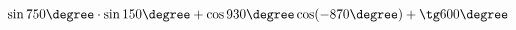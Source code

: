 \begin{ex}[type=calculate]
	\begin{condition}
		\( \sin750\degree\cdot\sin150\degree+\cos930\degree\cos(-870\degree)+\tg600\degree \)
	\end{condition}
\end{ex}